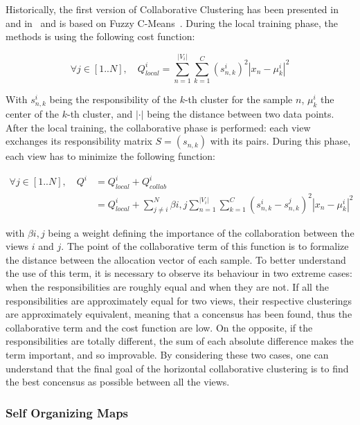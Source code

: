     Historically, the first version of Collaborative Clustering has been presented in~\cite{grozavu2010topological} and in~\cite{pedrycz2004fuzzy} and is based on Fuzzy C-Means~\cite{bezdek1984fcm}. During the local training phase, the methods is using the following cost function:

    \begin{equation}
    \forall j \in [1..N], \quad Q^i_{local} = \sum_{n=1}^{|V_i|}\sum_{k=1}^C{(s_{n,k}^i)}^2|x_n - \mu_k^i|^2
        \label{eq:local_fcm}
    \end{equation}

    With $s_{n,k}^i$ being the responsibility of the $k$-th cluster for the sample $n$, $\mu_k^i$ the center of the $k$-th cluster, and $|\cdot|$ being the distance between two data points. After the local training, the collaborative phase is performed: each view exchanges its responsibility matrix $S = (s_{n,k})$ with its pairs. During this phase, each view has to minimize the following function:

    \begin{align}
        \forall j \in [1..N], \quad Q^i &= Q^i_{local} + Q^i_{collab}\\
    &= Q^i_{local} + \sum_{j\neq i}^N \beta{i,j}\sum_{n=1}^{|V_i|}\sum_{k=1}^C{(s_{n,k}^i - s_{n,k}^j)}^2|x_n-\mu_k^i|^2
    \end{align}
    
    with $\beta{i,j}$ being a weight defining the importance of the collaboration between the views $i$ and $j$. The point of the collaborative term of this function is to formalize the distance between the allocation vector of each sample. To better understand the use of this term, it is necessary to observe its behaviour in two extreme cases: when the responsibilities are roughly equal and when they are not. If all the responsibilities are approximately equal for two views, their respective clusterings are approximately equivalent, meaning that a concensus has been found, thus the collaborative term and the cost function are low. On the opposite, if the responsibilities are totally different, the sum of each absolute difference makes the term important, and so improvable. By considering these two cases, one can understand that the final goal of the horizontal collaborative clustering is to find the best concensus as possible between all the views.

    \subsubsection{Self Organizing Maps}

